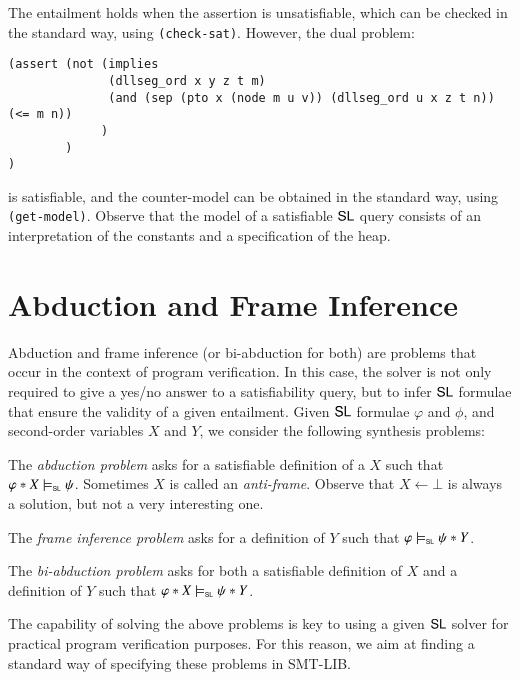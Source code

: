 \documentclass{llncs}
\begin{document}
The entailment holds when the assertion is unsatisfiable, which can be
checked in the standard way, using {\tt (check-sat)}. However, the
dual problem:
\begin{verbatim}
(assert (not (implies 
              (dllseg_ord x y z t m)
              (and (sep (pto x (node m u v)) (dllseg_ord u x z t n)) (<= m n)) 
             )
        )
)
\end{verbatim}
is satisfiable, and the counter-model can be obtained in the standard
way, using {\tt (get-model)}. Observe that the model of a satisfiable
$\mathsf{SL}$ query consists of an interpretation of the constants and a
specification of the heap. 

\section{Abduction and Frame Inference}

Abduction and frame inference (or bi-abduction for both) are problems
that occur in the context of program verification. In this case, the
solver is not only required to give a yes/no answer to a
satisfiability query, but to infer $\mathsf{SL}$ formulae that ensure the
validity of a given entailment. Given $\mathsf{SL}$ formulae $\varphi$ and
$\phi$, and second-order variables $X$ and $Y$, we consider the
following synthesis problems:


\begin{compactenum}
\item The \emph{abduction problem} asks for a satisfiable definition
  of a $X$ such that $\varphi * X \models_{\mathsf{\scriptscriptstyle{SL}}}
  \psi$. Sometimes $X$ is called an \emph{anti-frame}. Observe that $X
  \leftarrow \bot$ is always a solution, but not a very interesting
  one.
%
\item The \emph{frame inference problem} asks for a definition of $Y$
  such that $\varphi \models_{\mathsf{\scriptscriptstyle{SL}}} \psi * Y$.
%
\item The \emph{bi-abduction problem} asks for both a satisfiable
  definition of $X$ and a definition of $Y$ such that $\varphi * X
  \models_{\mathsf{\scriptscriptstyle{SL}}} \psi * Y$.
\end{compactenum}
The capability of solving the above problems is key to using a given
$\mathsf{SL}$ solver for practical program verification purposes. For this
reason, we aim at finding a standard way of specifying these problems
in SMT-LIB.
\end{document}

